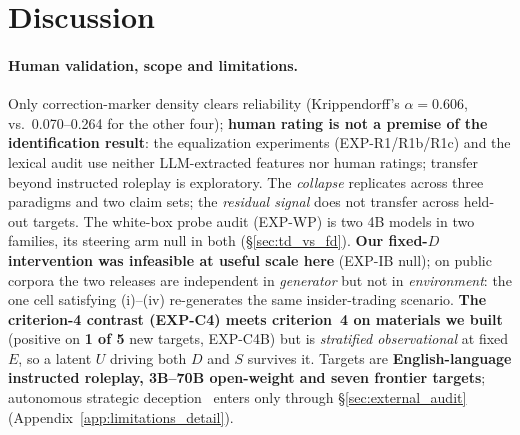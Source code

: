 \section{Discussion}
\label{sec:discussion}

\paragraph{Human validation, scope and limitations.}
\label{sec:icc_caveat}
\label{sec:icc_owned}
\label{sec:transfer_regimes}
\label{sec:blackbox_vs_whitebox}
\label{sec:haiku_defensiveness}
\label{sec:novelty}
\label{sec:protocol_generality}
\label{sec:loo_across_models}
\label{sec:limitations}
\label{sec:interrogation_role}
\label{sec:deployment}
Only correction-marker density clears reliability (Krippendorff's $\alpha\!=\!0.606$, vs.\ 0.070--0.264 for the other four); \textbf{human rating is not a premise of the identification result}: the equalization experiments (EXP-R1/R1b/R1c) and the lexical audit use neither LLM-extracted features nor human ratings; transfer beyond instructed roleplay is exploratory. The \emph{collapse} replicates across three paradigms and two claim sets; the \emph{residual signal} does not transfer across held-out targets. The white-box probe audit (EXP-WP) is two 4B models in two families, its steering arm null in both (§\ref{sec:td_vs_fd}). \textbf{Our fixed-$D$ intervention was infeasible at useful scale here} (EXP-IB null); on public corpora the two releases are independent in \emph{generator} but not in \emph{environment}: the one cell satisfying (i)--(iv) re-generates the same insider-trading scenario. \textbf{The criterion-4 contrast (EXP-C4) meets criterion~4 on materials we built} (positive on \textbf{1 of 5} new targets, EXP-C4B) but is \emph{stratified observational} at fixed $E$, so a latent $U$ driving both $D$ and $S$ survives it. Targets are \textbf{English-language instructed roleplay, 3B--70B open-weight and seven frontier targets}; autonomous strategic deception~\citep{hubinger2019risks, scheurer2024strategic, greenblatt2024alignment} enters only through §\ref{sec:external_audit} (Appendix~\ref{app:limitations_detail}).
